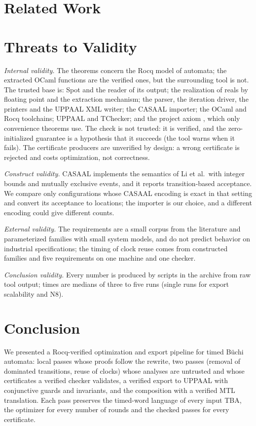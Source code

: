 \documentclass[preprint,12pt]{elsarticle}
\let\pathfragile\path
\DeclareRobustCommand\path{\pathfragile}
\begin{document}
\section{Related Work}
\label{sec:related}


\section{Threats to Validity}
\label{sec:threats}
\emph{Internal validity.} The theorems concern the Rocq model of automata; the extracted OCaml functions are the verified ones, but the surrounding tool is not. The trusted base is: Spot and the reader of its output; the realization of reals by floating point and the extraction mechanism; the parser, the iteration driver, the printers and the UPPAAL XML writer; the CASAAL importer; the OCaml and Rocq toolchains; UPPAAL and TChecker; and the project axiom , which only convenience theorems use. The check  is not trusted: it is verified, and the zero-initialized guarantee is a hypothesis that it succeeds (the tool warns when it fails).  The certificate producers are unverified by design: a wrong certificate is rejected and costs optimization, not correctness.

\emph{Construct validity.} CASAAL implements the semantics of Li et al.\ with integer bounds and mutually exclusive events, and it reports transition-based acceptance. We compare only configurations whose CASAAL encoding is exact in that setting and convert its acceptance to locations; the importer is our choice, and a different encoding could give different counts. 

\emph{External validity.} The requirements are a small corpus from the literature and parameterized families with small system models, and do not predict behavior on industrial specifications; the timing of clock reuse comes from constructed families and five requirements on one machine and one checker.

\emph{Conclusion validity.} Every number is produced by scripts in the archive from raw tool output; times are medians of three to five runs (single runs for export scalability and N8).

\section{Conclusion}
\label{sec:conclusion}
We presented a Rocq-verified optimization and export pipeline for timed B\"uchi automata: local passes whose proofs follow the rewrite, two passes (removal of dominated transitions, reuse of clocks) whose analyses are untrusted and whose certificates a verified checker validates, a verified export to UPPAAL with conjunctive guards and invariants, and the composition with a verified MTL translation. Each pass preserves the timed-word language of every input TBA, the optimizer for every number of rounds and the checked passes for every certificate.
\end{document}
